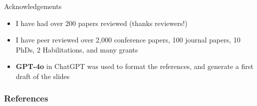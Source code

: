 \documentclass[aspectratio=169]{beamer}
\begin{document}


\begin{frame}{Acknowledgements}

  \begin{itemize}
 \item I have had over 200 papers reviewed (thanks reviewers!)
 \item I have peer reviewed over 2,000 conference papers, 100 journal papers, 10 PhDs, 2 Habilitations, and many grants
  \item \textbf{GPT-4o} in ChatGPT \citep{openai-chatgpt-2025-03-14} was used to format the references, and generate a first draft of the slides
  \aicheck
  \end{itemize}

\end{frame}


\begin{frame}[allowframebreaks]
\frametitle{References}
\printbibliography[heading=none]
\end{frame}
\end{document}
